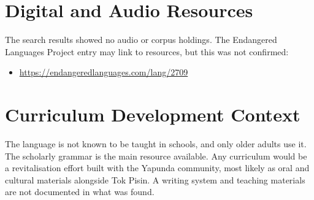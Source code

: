 \documentclass[12pt]{article}
\begin{document}
\section{Digital and Audio Resources}
The search results showed no audio or corpus holdings. The Endangered Languages Project entry may link to resources, but this was not confirmed:
\begin{itemize}
\item \url{https://endangeredlanguages.com/lang/2709}
\end{itemize}

\section{Curriculum Development Context}
The language is not known to be taught in schools, and only older adults use it. The scholarly grammar is the main resource available. Any curriculum would be a revitalisation effort built with the Yapunda community, most likely as oral and cultural materials alongside Tok Pisin. A writing system and teaching materials are not documented in what was found.
\end{document}
